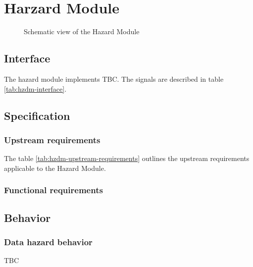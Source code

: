 \section{Harzard Module}

\begin{figure}[h!]
    \centering
    
    \caption{Schematic view of the Hazard Module}
    \label{fig:hzdm}
\end{figure}

\subsection{Interface}

\begin{content}
The hazard module implements TBC. The signals are described in table \ref{tab:hzdm-interface}. 
\end{content}



\subsection{Specification}

\subsubsection{Upstream requirements}

The table \ref{tab:hzdm-upstream-requirements} outlines the upstream requirements applicable to the Hazard Module.



\subsubsection{Functional requirements}

\subsection{Behavior}

\subsubsection{Data hazard behavior}

\begin{content}
    TBC
\end{content}

